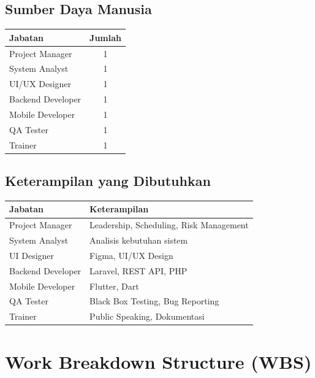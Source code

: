 \documentclass[12pt,a4paper]{article}
\begin{document}

\subsection{Sumber Daya Manusia}

\begin{table}[H]
\centering
\begin{tabular}{lc}
\toprule
Jabatan & Jumlah\\
\midrule
Project Manager & 1\\
System Analyst & 1\\
UI/UX Designer & 1\\
Backend Developer & 1\\
Mobile Developer & 1\\
QA Tester & 1\\
Trainer & 1\\
\bottomrule
\end{tabular}
\end{table}


\subsection{Keterampilan yang Dibutuhkan}

\begin{table}[H]
    \centering
    \begin{tabular}{ll}
    \toprule
    Jabatan & Keterampilan\\
    \midrule
    Project Manager & Leadership, Scheduling, Risk Management\\
    System Analyst & Analisis kebutuhan sistem\\
    UI Designer & Figma, UI/UX Design\\
    Backend Developer & Laravel, REST API, PHP\\
    Mobile Developer & Flutter, Dart\\
    QA Tester & Black Box Testing, Bug Reporting\\
    Trainer & Public Speaking, Dokumentasi\\
    \bottomrule
    \end{tabular}
\end{table}


\section{Work Breakdown Structure (WBS)}
\end{document}
